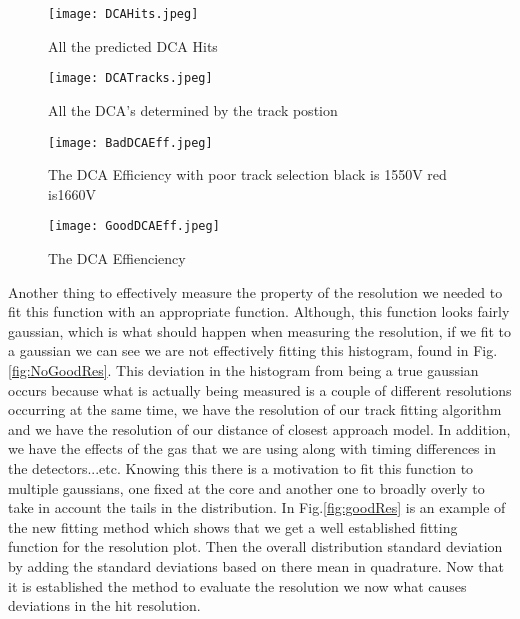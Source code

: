 \documentclass[./Thesis]{subfiles}
\begin{document}
\begin{figure}
	\centerline{\texttt{[image: DCAHits.jpeg]}}
	\caption[dcaHits]{ All the predicted DCA Hits}
	\label{fig:dcaHits}
\end{figure} 	

\begin{figure}
	\centerline{\texttt{[image: DCATracks.jpeg]}}
	\caption[DCA Tracks]{ All the DCA's determined by the track postion}
	\label{fig:dcaTracks}
\end{figure} 

\begin{figure}
	\centerline{\texttt{[image: BadDCAEff.jpeg]}}
	\caption[BadDCAEfficiency]{ The DCA Efficiency with poor track selection black is 1550V red is1660V}
	\label{fig:badDCAeff}
\end{figure} 	


\begin{figure}
	\centerline{\texttt{[image: GoodDCAEff.jpeg]}}
	\caption[Good DCA Effieciency]{ The DCA Effienciency}
	\label{fig:goodDCAeff}
\end{figure} 	

	 
	 Another thing to effectively measure the property of the resolution we needed to fit this function with an appropriate function. Although, this function looks fairly gaussian, which is what should happen when measuring the resolution, if we fit to a gaussian we can see we are not effectively fitting this histogram, found in Fig. \ref{fig:NoGoodRes}. This deviation in the histogram from being a true gaussian occurs because what is actually being measured is a couple of different resolutions occurring at the same time, we have the resolution of our track fitting algorithm and we have the resolution of our distance of closest approach model. In addition, we have the effects of the gas that we are using along with timing differences in the detectors...etc. Knowing this there is a motivation to fit this function to multiple gaussians, one fixed at the core and another one to broadly overly to take in account the tails in the distribution. In Fig.\ref{fig:goodRes}  is an example of the new fitting method which shows that we get a well established fitting function for the resolution plot. Then the overall distribution standard deviation by adding the standard deviations based on there mean in quadrature. Now that it is established the method to evaluate the resolution we now what causes deviations in the hit resolution.
	
	
\end{document}
